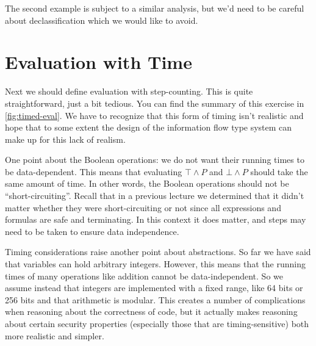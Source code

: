 \documentclass[11pt]{article}
\begin{document}
The second example is subject to a similar analysis, but we'd need to be careful
about declassification which we would like to avoid.

\section{Evaluation with Time}

Next we should define evaluation with step-counting. This is quite
straightforward, just a bit tedious.  You can find the summary of this exercise
in \autoref{fig:timed-eval}.  We have to recognize that this form of timing
isn't realistic and hope that to some extent the design of the information flow
type system can make up for this lack of realism.

One point about the Boolean operations: we do not want their running times to be
data-dependent.  This means that evaluating $\top \land P$ and $\bot \land P$
should take the same amount of time.  In other words, the Boolean operations
should not be ``short-circuiting''.  Recall that in a previous lecture we
determined that it didn't matter whether they were short-circuiting or not since
all expressions and formulas are safe and terminating.  In this context it does
matter, and steps may need to be taken to ensure data independence.

Timing considerations raise another point about abstractions.  So far we have
said that variables can hold arbitrary integers.  However, this means that the
running times of many operations like addition cannot be data-independent.  So
we assume instead that integers are implemented with a fixed range, like 64 bits
or 256 bits and that arithmetic is modular.  This creates a number of
complications when reasoning about the correctness of code, but it actually
makes reasoning about certain security properties (especially those that are
timing-sensitive) both more realistic and simpler.
\end{document}
